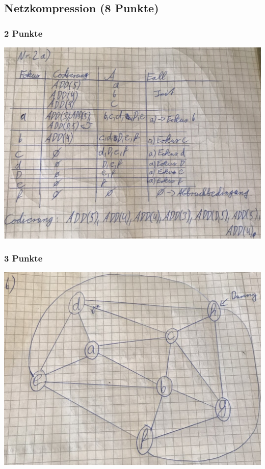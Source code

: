 \newif\ifvimbug
\vimbugfalse

\ifvimbug

\fi


\subsection{Netzkompression (8 Punkte)}
\subsubsection{2 Punkte}
\includegraphics[scale=0.5]{2a.jpg}

\subsubsection{3 Punkte}
\includegraphics[scale=0.45]{2b.jpg}
